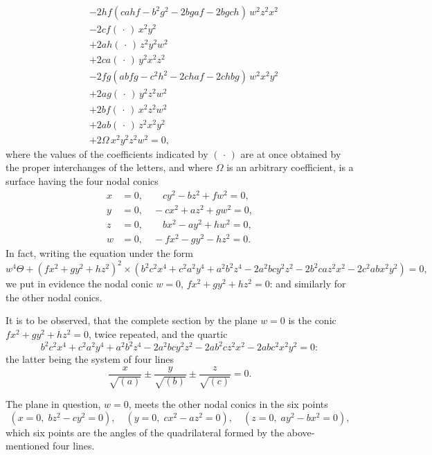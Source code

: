 \documentclass[11pt,a4paper]{article}
\begin{document}
\[
\begin{aligned}
&- 2hf(cahf - b^{2}g^{2} - 2bgaf - 2bgch)\, w^{2}z^{2}x^{2} \\
&- 2cf(\,\cdot\,)\, x^{2}y^{2} \\
&+ 2ah(\,\cdot\,)\, z^{2}y^{2}w^{2} \\
&+ 2ca(\,\cdot\,)\, y^{2}x^{2}z^{2} \\
&- 2fg(abfg - c^{2}h^{2} - 2chaf - 2chbg)\, w^{2}x^{2}y^{2} \\
&+ 2ag(\,\cdot\,)\, y^{2}z^{2}w^{2} \\
&+ 2bf(\,\cdot\,)\, x^{2}z^{2}w^{2} \\
&+ 2ab(\,\cdot\,)\, z^{2}x^{2}y^{2} \\
&+ 2\Omega\, x^{2}y^{2}z^{2}w^{2} = 0,
\end{aligned}
\]
where the values of the coefficients indicated by $(\,\cdot\,)$ are at once obtained by the proper interchanges of the letters, and where $\Omega$ is an arbitrary coefficient, is a surface having the four nodal conics
\[
\begin{aligned}
x &= 0, \qquad cy^{2} - bz^{2} + fw^{2} = 0, \\
y &= 0, \quad -cx^{2} + az^{2} + gw^{2} = 0, \\
z &= 0, \qquad bx^{2} - ay^{2} + hw^{2} = 0, \\
w &= 0, \quad -fx^{2} - gy^{2} - hz^{2} = 0.
\end{aligned}
\]
In fact, writing the equation under the form
\[
w^{4}\Theta + (fx^{2} + gy^{2} + hz^{2})^{2} \times (b^{2}c^{2}x^{4} + c^{2}a^{2}y^{4} + a^{2}b^{2}z^{4} - 2a^{2}bcy^{2}z^{2} - 2b^{2}caz^{2}x^{2} - 2c^{2}abx^{2}y^{2}) = 0,
\]
we put in evidence the nodal conic $w = 0$, $fx^{2} + gy^{2} + hz^{2} = 0$: and similarly for the other nodal conics.

It is to be observed, that the complete section by the plane $w = 0$ is the conic $fx^{2} + gy^{2} + hz^{2} = 0$, twice repeated, and the quartic
\[
b^{2}c^{2}x^{4} + c^{2}a^{2}y^{4} + a^{2}b^{2}z^{4} - 2a^{2}bcy^{2}z^{2} - 2ab^{2}cz^{2}x^{2} - 2abc^{2}x^{2}y^{2} = 0:
\]
the latter being the system of four lines
\[
\frac{x}{\sqrt{(a)}} \pm \frac{y}{\sqrt{(b)}} \pm \frac{z}{\sqrt{(c)}} = 0.
\]

The plane in question, $w = 0$, meets the other nodal conics in the six points
\[
(x = 0, \; bz^{2} - cy^{2} = 0), \quad (y = 0, \; cx^{2} - az^{2} = 0), \quad (z = 0, \; ay^{2} - bx^{2} = 0),
\]
which six points are the angles of the quadrilateral formed by the above-mentioned four lines.
\end{document}
